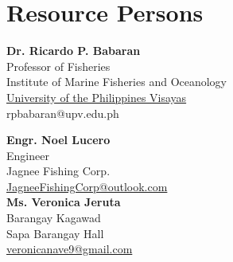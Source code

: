 %
%
%                 

\chapter{Resource Persons}
\label{sec:appendixb}

%
%
%
%

%
%

\newcommand{\resperson}[4]{\textbf{#1} \\ #2 \\ #3 \\ \url{#4}\vspace{0.5em}\\}

\resperson{Dr. Ricardo P. Babaran }
{Professor of Fisheries}
{Institute of Marine Fisheries and Oceanology}
{University of the Philippines Visayas}
{rpbabaran@upv.edu.ph}

\resperson{Engr. Noel Lucero }{Engineer}{Jagnee Fishing Corp. }{JagneeFishingCorp@outlook.com}
\resperson{Ms. Veronica Jeruta }{Barangay Kagawad}{Sapa Barangay Hall }{veronicanave9@gmail.com}